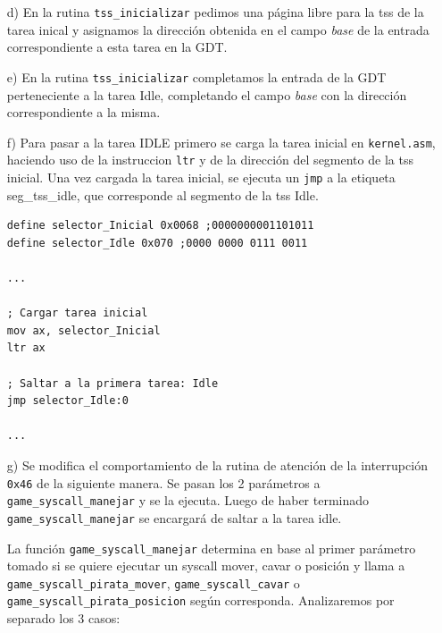 \begin{enumerate}
\item[d)] En la rutina {\tt tss\_inicializar} pedimos una página libre para la tss de la tarea inical y asignamos la dirección obtenida en el campo {\it base} de la entrada correspondiente a esta tarea en la GDT.

\item[e)] En la rutina {\tt tss\_inicializar} completamos la entrada de la GDT perteneciente a la tarea Idle, completando el campo {\it base} con la dirección correspondiente a la misma.

\item[f)]Para pasar a la tarea IDLE primero se carga la tarea inicial en {\tt kernel.asm}, haciendo uso de la instruccion {\tt ltr} y de la dirección del segmento de la tss inicial. Una vez cargada la tarea inicial, se ejecuta un {\tt jmp} a la etiqueta seg_tss_idle, que corresponde al segmento de la tss Idle.

\begin{lstlisting}[frame=single]
define selector_Inicial 0x0068 ;0000000001101011
define selector_Idle 0x070 ;0000 0000 0111 0011

...

; Cargar tarea inicial
mov ax, selector_Inicial
ltr ax

; Saltar a la primera tarea: Idle
jmp selector_Idle:0

...
\end{lstlisting}

\item[g)]Se modifica el comportamiento de la rutina de atención de la interrupción {\tt 0x46} de la siguiente manera. Se pasan los 2 parámetros a {\tt game\_syscall\_manejar} y se la ejecuta. Luego de haber terminado {\tt game\_syscall\_manejar} se encargará de saltar a la tarea idle. 

La función {\tt game\_syscall\_manejar} determina en base al primer parámetro tomado si se quiere ejecutar un syscall mover, cavar o posición y llama a {\tt game\_syscall\_pirata\_mover}, {\tt game\_syscall\_cavar} o {\tt game\_syscall\_pirata\_posicion} según corresponda. Analizaremos por separado los 3 casos:
\begin{itemize}


\end{itemize}
\end{enumerate}
